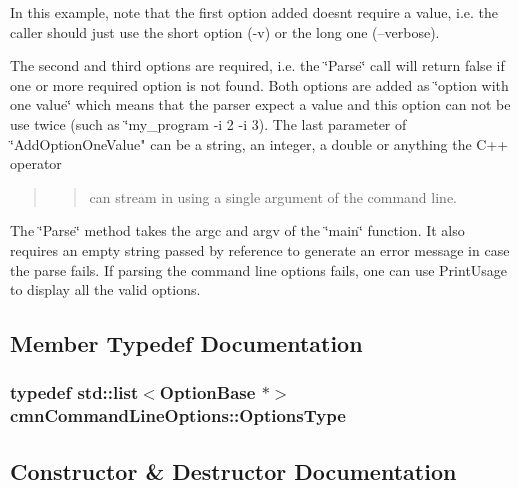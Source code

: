 In this example, note that the first option added doesn\textquotesingle{}t require a value, i.\+e. the caller should just use the short option (-\/v) or the long one (--verbose).

The second and third options are required, i.\+e. the \char`\"{}\+Parse\char`\"{} call will return false if one or more required option is not found. Both options are added as \char`\"{}option with one value\char`\"{} which means that the parser expect a value and this option can not be use twice (such as \char`\"{}my\+\_\+program -\/i 2 -\/i 3).  The last parameter of \char`\"{}Add\+Option\+One\+Value" can be a string, an integer, a double or anything the C++ operator \begin{quote}
\begin{quote}
can stream in using a single argument of the command line. \end{quote}
\end{quote}


The \char`\"{}\+Parse\char`\"{} method takes the argc and argv of the \char`\"{}main\char`\"{} function. It also requires an empty string passed by reference to generate an error message in case the parse fails. If parsing the command line options fails, one can use Print\+Usage to display all the valid options. 

\subsection{Member Typedef Documentation}
\hypertarget{classcmn_command_line_options_a421232856a8c450024b205ed8a4c4c7d}{}
\subsubsection[{Options\+Type}]{\setlength{\rightskip}{0pt plus 5cm}typedef std\+::list$<${\bf Option\+Base} $\ast$$>$ {\bf cmn\+Command\+Line\+Options\+::\+Options\+Type}\hspace{0.3cm}{\ttfamily [protected]}}\label{classcmn_command_line_options_a421232856a8c450024b205ed8a4c4c7d}


\subsection{Constructor \& Destructor Documentation}
\hypertarget{classcmn_command_line_options_a240f609539b5521aea0ac95ba9753161}{}
